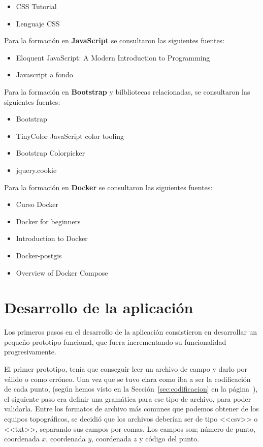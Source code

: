 \begin{itemize}
\item CSS Tutorial \cite{css3}
\item Lenguaje CSS \cite{css3_1}
\end{itemize}

Para la formación en \textbf{JavaScript} se consultaron las siguientes fuentes:

\begin{itemize}
\item Eloquent JavaScript: A Modern Introduction to Programming \cite{JavaScript}
\item Javascript a fondo \cite{JavaScript_1}
\end{itemize}

Para la formación en \textbf{Bootstrap} y bilbliotecas relacionadas, se consultaron las siguientes fuentes:

\begin{itemize}
\item Bootstrap \cite{Bootstrap}
\item TinyColor JavaScript color tooling \cite{TinyColor}
\item Bootstrap Colorpicker \cite{Colorpicker}
\item jquery.cookie \cite{j-cookie}
\end{itemize}


Para la formación en \textbf{Docker} se consultaron las siguientes fuentes:

\begin{itemize}
\item Curso Docker \cite{Docker}
\item Docker for beginners \cite{Docker_1}
\item Introduction to Docker \cite{Docker_2}
\item Docker-postgis \cite{Docker_3}
\item Overview of Docker Compose \cite{Docker_4}
\end{itemize}

\section{Desarrollo de la aplicación}

Los primeros pasos en el desarrollo de la aplicación consistieron en desarrollar un pequeño prototipo funcional, que fuera incrementando su funcionalidad progresivamente.

El primer prototipo, tenía que conseguir leer un archivo de campo y darlo por válido o como erróneo. Una vez que se tuvo clara como iba a ser la codificación de cada punto, (según hemos visto en la Sección~\ref{sec:codificacion} en la página~\pageref{sec:codificacion}), el siguiente paso era definir una gramática para ese tipo de archivo, para poder validarla. Entre los formatos de archivo más comunes que podemos obtener de los equipos topográficos, se decidió que los archivos deberían ser de tipo <<csv>> o <<txt>>, separando sus campos por comas. Los campos son; número de punto, coordenada $x$, coordenada $y$, coordenada $z$ y código del punto. 

